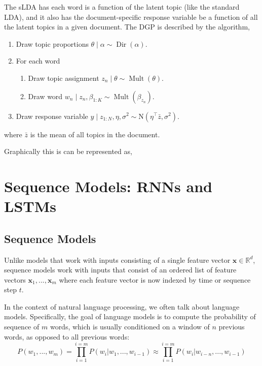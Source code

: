 \documentclass[
]{book}
\providecommand{\tightlist}{%
  \setlength{\itemsep}{0pt}\setlength{\parskip}{0pt}}
\begin{document}
The sLDA has each word is a function of the latent topic (like the standard LDA), and it also has the document-specific response variable be a function of all the latent topics in a given document. The DGP is described by the algorithm,

\begin{enumerate}
\def\labelenumi{\arabic{enumi}.}
\tightlist
\item
  Draw topic proportions \(\theta \mid \alpha \sim \operatorname{Dir}(\alpha)\).
\item
  For each word

  \begin{enumerate}
  \def\labelenumii{(\alph{enumii})}
  \tightlist
  \item
    Draw topic assignment \(z_{n} \mid \theta \sim \operatorname{Mult}(\theta)\).
  \item
    Draw word \(w_{n} \mid z_{n}, \beta_{1: K} \sim \operatorname{Mult}\left(\beta_{z_{n}}\right)\).
  \end{enumerate}
\item
  Draw response variable \(y \mid z_{1: N}, \eta, \sigma^{2} \sim \mathrm{N}\left(\eta^{\top} \bar{z}, \sigma^{2}\right)\).
\end{enumerate}

where \(\bar z\) is the mean of all topics in the document.

Graphically this is can be represented as,

\hypertarget{sequence-models-rnns-and-lstms}{%
\chapter{Sequence Models: RNNs and LSTMs}\label{sequence-models-rnns-and-lstms}}

\hypertarget{sequence-models}{%
\section{Sequence Models}\label{sequence-models}}

Unlike models that work with inputs consisting of a single feature vector \(\mathbf{x}\in \mathbb{R}^d\), sequence models work with inputs that consist of an ordered list of feature vectors \(\mathbf{x}_1, ..., \mathbf{x}_m\) where each feature vector is now indexed by time or sequence step \(t\).

In the context of natural language processing, we often talk about language models. Specifically, the goal of language models is to compute the probability of sequence of \(m\) words, which is usually conditioned on a window of \(n\) previous words, as opposed to all previous words:
\[
P(w_1, ..., w_m) = \prod_{i=1}^{i=m} P(w_i | w_1,...,w_{i-1}) \approx \prod_{i=1}^{i=m} P(w_i | w_{i-n},...,w_{i-1})
\]
\end{document}
